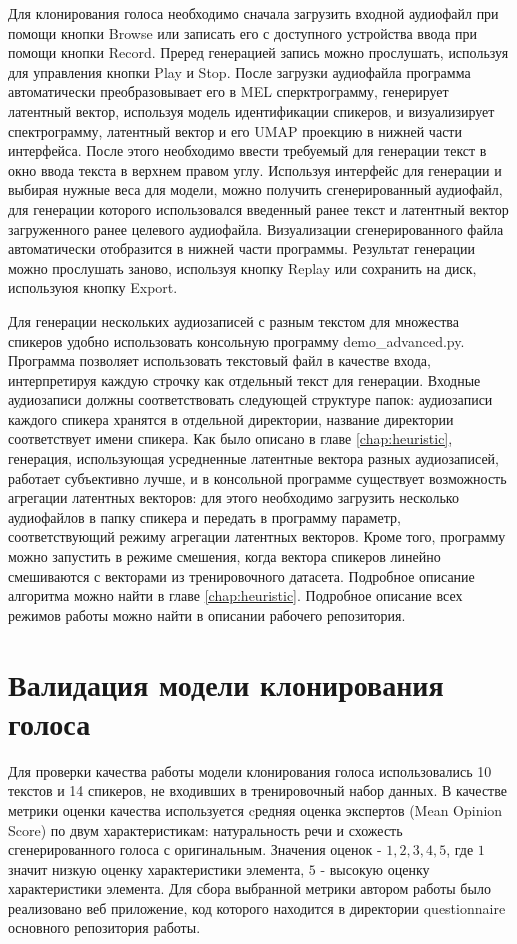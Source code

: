 \documentclass[oneside,final,14pt]{extreport}
\begin{document}
Для клонирования голоса необходимо сначала загрузить входной аудиофайл при помощи кнопки Browse или записать его с доступного устройства ввода при помощи кнопки Record. Преред генерацией запись можно прослушать, используя для управления кнопки Play и Stop. После загрузки аудиофайла программа автоматически преобразовывает его в MEL сперктрограмму, генерирует латентный вектор, используя модель идентификации спикеров, и визуализирует спектрограмму, латентный вектор и его UMAP проекцию в нижней части интерфейса. После этого необходимо ввести требуемый для генерации текст в окно ввода текста в верхнем правом углу. Используя интерфейс для генерации и выбирая нужные веса для модели, можно получить сгенерированный аудиофайл, для генерации которого использовался введенный ранее текст и латентный вектор загруженного ранее целевого аудиофайла. Визуализации сгенерированного файла автоматически отобразится в нижней части программы. Результат генерации можно прослушать заново, используя кнопку Replay или сохранить на диск, используюя кнопку Export. 

Для генерации нескольких аудиозаписей с разным текстом для множества спикеров удобно использовать консольную программу demo_advanced.py. Программа позволяет использовать текстовый файл в качестве входа, интерпретируя каждую строчку как отдельный текст для генерации. Входные аудиозаписи должны соответствовать следующей структуре папок: аудиозаписи каждого спикера хранятся в отдельной директории, название директории соответствует имени спикера. Как было описано в главе \ref{chap:heuristic}, генерация, использующая усредненные латентные вектора разных аудиозаписей, работает субъективно лучше, и в консольной программе существует возможность агрегации латентных векторов: для этого необходимо загрузить несколько аудиофайлов в папку спикера и передать в программу параметр, соответствующий режиму агрегации латентных векторов. Кроме того, программу можно запустить в режиме смешения, когда вектора спикеров линейно смешиваются с векторами из тренировочного датасета. Подробное описание алгоритма можно найти в главе \ref{chap:heuristic}. Подробное описание всех режимов работы можно найти в описании рабочего репозитория.

\section{Валидация модели клонирования голоса}
\label{chap:results}
Для проверки качества работы модели клонирования голоса использовались 10 текстов и 14 спикеров, не входивших в тренировочный набор данных. В качестве метрики оценки качества используется cредняя оценка экспертов (Mean Opinion Score) по двум характеристикам: натуральность речи и схожесть сгенерированного голоса с  оригинальным. Значения оценок - $1, 2, 3, 4, 5$, где $1$ значит низкую оценку характеристики элемента, $5$ - высокую оценку характеристики элемента. Для сбора выбранной метрики автором работы было реализовано веб приложение, код которого находится в директории questionnaire основного репозитория работы. 
\end{document}
